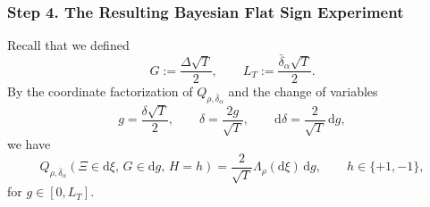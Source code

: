 \documentclass[10pt]{article}
\newcommand{\dd}{\mathrm{d}}
\theoremstyle{plain}
\begin{document}









\subsubsection{Step 4. The Resulting Bayesian Flat Sign Experiment}

Recall that we defined
\[
    G:=\frac{\Delta\sqrt T}{2},
    \qquad
    L_T:=\frac{\bar\delta_\alpha\sqrt T}{2}.
\]
By the coordinate factorization of $Q_{\rho,\bar\delta_\alpha}$ and the
change of variables
\[
    g=\frac{\delta\sqrt T}{2},
    \qquad
    \delta=\frac{2g}{\sqrt T},
    \qquad
    \dd\delta=\frac{2}{\sqrt T}\,\dd g,
\]
we have
\[
    Q_{\rho,\bar\delta_\alpha}
    \left(
        \Xi\in\dd\xi,\,
        G\in\dd g,\,
        H=h
    \right)
    =
    \frac{2}{\sqrt T}
    \Lambda_\rho(\dd\xi)\,\dd g,
    \qquad
    h\in\{+1,-1\},
\]
for $g\in[0,L_T]$.
\end{document}
